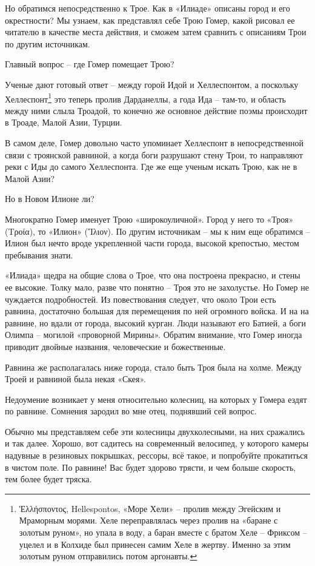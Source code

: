 Но обратимся непосредственно к Трое. Как в «Илиаде» описаны город и его окрестности? Мы узнаем, как представлял себе Трою Гомер, какой рисовал ее читателю в качестве места действия, и сможем затем сравнить с описаниям Трои по другим источникам.

Главный вопрос – где Гомер помещает Трою?

Ученые дают готовый ответ – между горой Идой и Хеллеспонтом, а поскольку Хеллеспонт\footnote{Ἑλλήσποντος, Hellespontos, «Море Хели» – пролив между Эгейским и Мраморным морями. Хеле переправлялась через пролив на «баране с золотым руном», но упала в воду, а баран вместе с братом Хеле –  Фриксом – уцелел и в Колхиде был принесен самим Хеле в жертву. Именно за этим золотым руном отправились потом аргонавты.} это теперь пролив Дарданеллы, а года Ида – там-то, и область между ними слыла Троадой, то конечно же основное действие поэмы происходит в Троаде, Малой Азии, Турции.

В самом деле, Гомер довольно часто упоминает Хеллеспонт в непосредственной связи с троянской равниной, а когда боги разрушают стену Трои, то направляют реки с Иды до самого Хеллеспонта. Где же еще ученым искать Трою, как не в Малой Азии?

Но в Новом Илионе ли?

Многократно Гомер именует Трою «широкоуличной». Город у него то «Троя» (Τροία), то «Илион» (Ἴλιον). По другим источникам – мы к ним еще обратимся – Илион был нечто вроде укрепленной части города, высокой крепостью, местом пребывания знати.

«Илиада» щедра на общие слова о Трое, что она построена прекрасно, и стены ее высокие. Толку мало, разве что понятно – Троя это не захолустье. Но Гомер не чуждается подробностей. Из повествования следует, что
около Трои есть равнина, достаточно большая для перемещения по ней огромного войска. И на на равнине, но вдали от города, высокий курган.
Люди называют его Батией, а боги Олимпа – могилой «проворной Мирины». Обратим внимание, что Гомер иногда приводит двойные названия, человеческие и божественные.

Равнина же располагалась ниже города, стало быть Троя была на холме. Между Троей и равниной была некая «Скея».

Недоумение возникает у меня относительно колесниц, на которых у Гомера ездят по равнине. Сомнения зародил во мне отец, поднявший сей вопрос.

Обычно мы представляем себе эти колесницы двухколесными, на них сражались и так далее. Хорошо, вот садитесь на современный велосипед, у которого камеры надувные в резиновых покрышках, рессоры, всё такое, и попробуйте прокатиться в чистом поле. По равнине! Вас будет здорово трясти, и чем больше скорость, тем более будет тряска.

